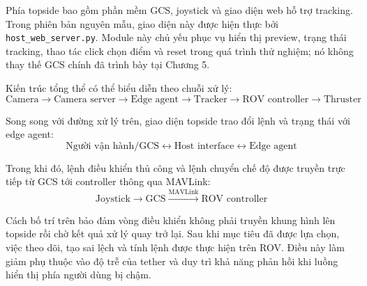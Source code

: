 \documentclass[../DoAn.tex]{subfiles}
\begin{document}
Phía topside bao gồm phần mềm GCS, joystick và giao diện web hỗ trợ tracking. Trong phiên bản nguyên mẫu, giao diện này được hiện thực bởi \texttt{host\_web\_server.py}. Module này chủ yếu phục vụ hiển thị preview, trạng thái tracking, thao tác click chọn điểm và reset trong quá trình thử nghiệm; nó không thay thế GCS chính đã trình bày tại Chương 5.

Kiến trúc tổng thể có thể biểu diễn theo chuỗi xử lý:
\[
\text{Camera} \longrightarrow \text{Camera server} \longrightarrow \text{Edge agent} \longrightarrow \text{Tracker} \longrightarrow \text{ROV controller} \longrightarrow \text{Thruster}
\]

Song song với đường xử lý trên, giao diện topside trao đổi lệnh và trạng thái với edge agent:
\[
\text{Người vận hành/GCS} \longleftrightarrow \text{Host interface} \longleftrightarrow \text{Edge agent}
\]

Trong khi đó, lệnh điều khiển thủ công và lệnh chuyển chế độ được truyền trực tiếp từ GCS tới controller thông qua MAVLink:
\[
\text{Joystick} \longrightarrow \text{GCS} \xrightarrow{\text{MAVLink}} \text{ROV controller}
\]

Cách bố trí trên bảo đảm vòng điều khiển không phải truyền khung hình lên topside rồi chờ kết quả xử lý quay trở lại. Sau khi mục tiêu đã được lựa chọn, việc theo dõi, tạo sai lệch và tính lệnh được thực hiện trên ROV. Điều này làm giảm phụ thuộc vào độ trễ của tether và duy trì khả năng phản hồi khi luồng hiển thị phía người dùng bị chậm.
\end{document}
